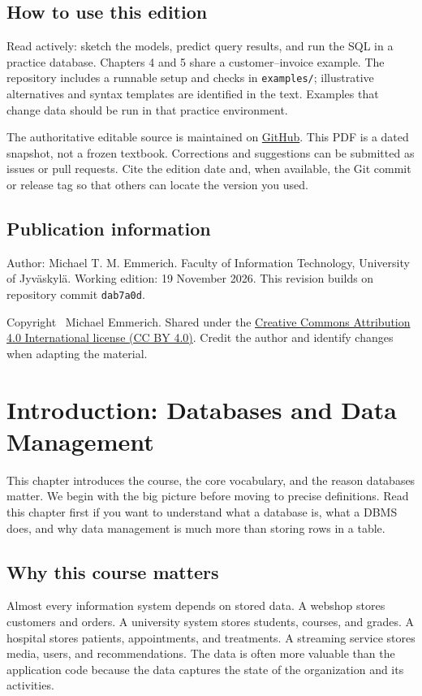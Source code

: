 \documentclass[11pt,a4paper,openany]{book}
\begin{document}
\section*{How to use this edition}
Read actively: sketch the models, predict query results, and run the SQL in a practice database. Chapters 4 and 5 share a customer--invoice example. The repository includes a runnable setup and checks in \texttt{examples/}; illustrative alternatives and syntax templates are identified in the text. Examples that change data should be run in that practice environment.

The authoritative editable source is maintained on \href{https://github.com/emmerichmtm/DatabasesAndDataManagement}{GitHub}. This PDF is a dated snapshot, not a frozen textbook. Corrections and suggestions can be submitted as issues or pull requests. Cite the edition date and, when available, the Git commit or release tag so that others can locate the version you used.

\section*{Publication information}
Author: Michael T. M. Emmerich. Faculty of Information Technology, University of Jyväskylä. Working edition: 19 November 2026. This revision builds on repository commit \texttt{dab7a0d}.

Copyright \textcopyright\ Michael Emmerich. Shared under the \href{https://creativecommons.org/licenses/by/4.0/}{Creative Commons Attribution 4.0 International license (CC BY 4.0)}. Credit the author and identify changes when adapting the material.

\tableofcontents

\mainmatter

\chapter[Introduction]{Introduction: Databases and Data Management}
\begin{guidancebox}
This chapter introduces the course, the core vocabulary, and the reason databases matter. We begin with the big picture before moving to precise definitions. Read this chapter first if you want to understand what a database is, what a DBMS does, and why data management is much more than storing rows in a table.
\end{guidancebox}

\section{Why this course matters}
Almost every information system depends on stored data. A webshop stores customers and orders. A university system stores students, courses, and grades. A hospital stores patients, appointments, and treatments. A streaming service stores media, users, and recommendations. The data is often more valuable than the application code because the data captures the state of the organization and its activities.
\end{document}
